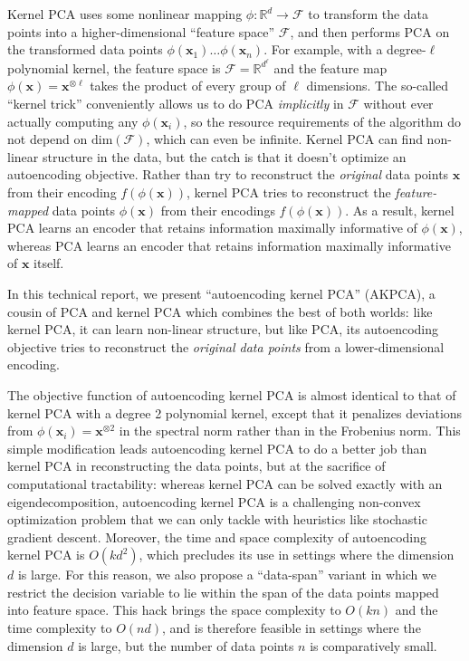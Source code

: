\documentclass[]{article}
\newcommand{\reals}{\mathbb{R}}
\begin{document}
Kernel PCA \cite{scholkopf1997} uses some nonlinear mapping $\phi: \reals^d \to \mathcal{F}$ to transform the data points into a higher-dimensional ``feature space'' $\mathcal{F}$, and then performs PCA on the transformed data points $\phi(\mathbf{x}_1) \hdots \phi(\mathbf{x}_n)$.
For example, with a degree-$\ell$ polynomial kernel, the feature space is $\mathcal{F} = \reals^{d^\ell}$ and the feature map $\phi(\mathbf{x}) = \mathbf{x}^{\otimes \ell} $ takes the product of every group of $\ell$ dimensions. 
 The so-called ``kernel trick'' conveniently allows us to do PCA \textit{implicitly} in $\mathcal{F}$ without ever actually computing any $\phi(\mathbf{x}_i)$, so the resource requirements of the algorithm do not depend on $\text{dim}(\mathcal{F})$, which can even be infinite.
Kernel PCA can find non-linear structure in the data, but the catch is that it doesn't optimize an autoencoding objective.
Rather than try to reconstruct the \textit{original} data points $\mathbf{x}$ from their encoding $f(\phi(\mathbf{x}))$, kernel PCA tries to reconstruct the \textit{feature-mapped} data points $\phi(\mathbf{x})$ from their encodings $f(\phi(\mathbf{x}))$.
As a result, kernel PCA learns an encoder that retains information maximally informative of $\phi(\mathbf{x})$, whereas PCA learns an encoder that retains information maximally informative of $\mathbf{x}$ itself.
  

In this technical report, we present ``autoencoding kernel PCA'' (AKPCA), a cousin of PCA and kernel PCA which combines the best of both worlds: like kernel PCA, it can learn non-linear structure, but like PCA, its autoencoding objective tries to reconstruct the \textit{original data points} from a lower-dimensional encoding.

The objective function of autoencoding kernel PCA is almost identical to that of kernel PCA with a degree 2 polynomial kernel, except that it penalizes deviations from $\phi(\mathbf{x}_i) = \mathbf{x}^{\otimes 2}$ in the spectral norm rather than in the Frobenius norm.
This simple modification leads autoencoding kernel PCA to do a better job than kernel PCA in reconstructing the data points, but at the sacrifice of computational tractability: whereas kernel PCA can be solved exactly with an eigendecomposition, autoencoding kernel PCA is a challenging non-convex optimization problem that we can only tackle with heuristics like stochastic gradient descent.
Moreover, the time and space complexity of autoencoding kernel PCA is $O(k d^{2})$, which precludes its use in settings where the dimension $d$ is large.
For this reason, we also propose a ``data-span'' variant in which we restrict the decision variable to lie within the span of the data points mapped into feature space.
This hack brings the space complexity to $O(kn)$ and the time complexity to $O(nd)$, and is therefore feasible in settings where the dimension $d$ is large, but the number of data points $n$ is comparatively small.
\end{document}
